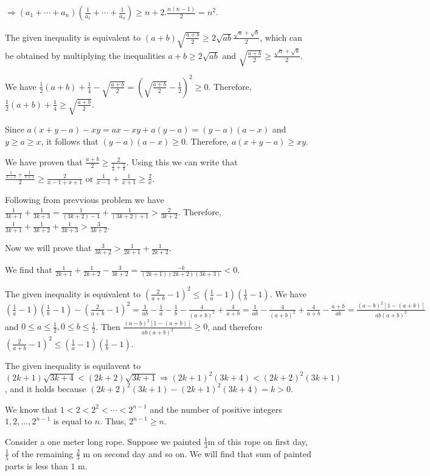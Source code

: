   $\Rightarrow (a_1 + \cdots + a_n)\left(\frac{1}{a_1} + \cdots + \frac{1}{a_n}\right)\geq n + 2.\frac{n(n -
    1)}{2} = n^2$.
\item The given inequality is equivalent to $(a + b)\sqrt{\frac{a + b}{2}}\geq 2\sqrt{ab}\frac{\sqrt{a} +
  \sqrt{b}}{2}$, which can be obtained by multiplying the inequalities $a + b\geq 2\sqrt{ab}$ and
  $\sqrt{\frac{a + b}{2}}\geq \frac{\sqrt{a} + \sqrt{b}}{2}$.
\item We have $\frac{1}{2}(a + b) + \frac{1}{4} - \sqrt{\frac{a + b}{2}} = \left(\sqrt{\frac{a + b}{2}} -
  \frac{1}{2}\right)^2\geq 0$. Therefore, $\frac{1}{2}(a + b) + \frac{1}{4}\geq \sqrt{\frac{a + b}{2}}$.
\item Since $a(x + y − a) − xy = ax − xy + a(y − a) = (y − a)(a − x)$ and $y \geq a \geq x$, it follows that
  $(y − a)(a − x) \geq 0$. Therefore, $a(x + y − a) \geq xy$.
\item We have proven that $\frac{a + b}{2}\geq \frac{2}{\frac{1}{a} + \frac{1}{b}}$. Using this we can write
  that $\frac{\frac{1}{x - 1} + \frac{1}{x + 1}}{2}\geq \frac{2}{x - 1 + x + 1}$ or $\frac{1}{x - 1} +
  \frac{1}{x + 1}\geq \frac{2}{x}$.
\item Following from prevvious problem we have $\frac{1}{3k + 1} + \frac{1}{3k+ 3} = \frac{1}{(3k+ 2) - 1} +
  \frac{1}{(3k + 2) + 1} > \frac{2}{3k + 2}$. Therefore, $\frac{1}{3k + 1} + \frac{1}{3k + 2} + \frac{1}{3k
    + 3} > \frac{3}{3k + 2}$.

  Now we will prove that $\frac{3}{3k + 2} > \frac{1}{2k + 1} + \frac{1}{2k + 2}$.

  We find that $\frac{1}{2k + 1} + \frac{1}{2k + 2} - \frac{3}{3k + 2} = \frac{-k}{(2k + 1)(2k + 2)(3k + 3)}
  < 0$.
\item The given inequality is equivalent to $\left(\frac{2}{a + b} - 1\right)^2\leq \left(\frac{1}{a} -
  1\right)\left(\frac{1}{b} - 1\right)$. We have $\left(\frac{1}{a} - 1\right)\left(\frac{1}{b} - 1\right) -
  \left(\frac{2}{a + b} - 1\right)^2 = \frac{1}{ab} - \frac{1}{a}- \frac{1}{b} - \frac{4}{(a + b)^2} +
  \frac{4}{a + b} = \frac{1}{ab} - \frac{4}{(a + b)^2} + \frac{4}{a + b} - \frac{a + b}{ab} = \frac{(a -
    b)^2[1 - (a + b)]}{ab(a + b)^2}$ and $0\leq a\leq \frac{1}{2}, 0\leq b\leq \frac{1}{2}$. Then $\frac{(a
    - b)^2[1 - (a + b)]}{ab(a + b)^2}\geq 0$, and therefore $\left(\frac{2}{a + b} - 1\right)^2\leq
  \left(\frac{1}{a} - 1\right)\left(\frac{1}{b} - 1\right)$.
\item The given inequality is equilavent to $(2k + 1)\sqrt{3k + 4} < (2k + 2)\sqrt{3k + 1} \Rightarrow (2k +
  1)^2(3k + 4) < (2k + 2)^2(3k + 1)$, and it holds because $(2k + 2)^2(3k + 1) - (2k + 1)^2(3k + 4) = k >
  0$.
\item We know that $1 < 2 < 2^2 < \cdots < 2^{n - 1}$ and the number of positive integers $1, 2, \ldots,
  2^{n - 1}$ is equal to $n$. Thus, $2^{n - 1}\geq n$.
\item Consider a one meter long rope. Suppose we painted $\frac{1}{3}$m of this rope on first day,
  $\frac{1}{5}$ of the remaining $\frac{2}{3}$ m on second day and so on. We will find that sum of painted
  parts is less than $1$ m.


